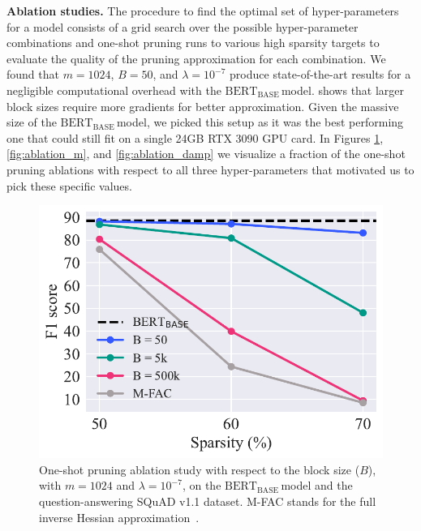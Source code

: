 \documentclass[11pt]{article}
\newcommand{\bert}{$\textrm{BERT}_{\textrm{BASE}}\,$}
\begin{document}
\noindent\textbf{Ablation studies.} The procedure to find the optimal set of hyper-parameters for a model consists of a grid search over the possible hyper-parameter combinations and one-shot pruning runs to various high sparsity targets to evaluate the quality of the pruning approximation for each combination. We found that $m=1024$, $B=50$, and $\lambda=10^{-7}$ produce state-of-the-art results for a negligible computational overhead with the \bert model. \citet{Frantar2021EfficientMA} shows that larger block sizes require more gradients for better approximation. Given the massive size of the \bert model, we picked this setup as it was the best performing one that could still fit on a single 24GB RTX 3090 GPU card. In Figures \ref{fig:ablation_B}, \ref{fig:ablation_m}, and \ref{fig:ablation_damp} we visualize a fraction of the one-shot pruning ablations with respect to all three hyper-parameters that motivated us to pick these specific values.

\begin{figure}
    \centering
    \includegraphics[scale=0.5]{media/ablation_B.pdf}
    \caption{One-shot pruning ablation study with respect to the block size ($B$), with $m = 1024$ and $\lambda = 10^{-7}$, on the \bert model and the question-answering SQuAD v1.1 dataset. M-FAC stands for the full inverse Hessian approximation~\cite{Frantar2021EfficientMA}.}
    \label{fig:ablation_B}
\end{figure}
\end{document}
